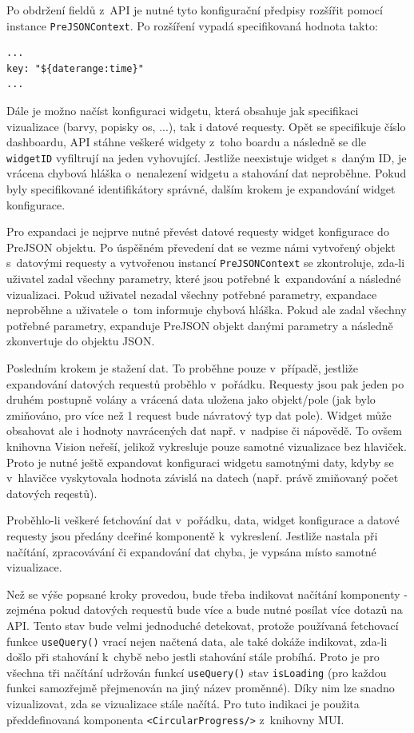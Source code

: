 \documentclass[czech, bc, kiv, he, iso690numb, viewonly]{fasthesis} %
\begin{document}
Po obdržení fieldů z~API je nutné tyto konfigurační předpisy rozšířit pomocí instance \texttt{PreJSONContext}. Po rozšíření vypadá specifikovaná hodnota takto:
\lstset{style=plainsrc}
\begin{lstlisting}
...
key: "${daterange:time}"
...
\end{lstlisting}

Dále je možno načíst konfiguraci widgetu, která obsahuje jak specifikaci vizualizace (barvy, popisky os, ...), tak i datové requesty. Opět se specifikuje číslo dashboardu, API stáhne veškeré widgety z~toho boardu a následně se dle \texttt{widgetID} vyfiltrují na jeden vyhovující. Jestliže
neexistuje widget s~daným ID, je vrácena chybová hláška o~nenalezení widgetu a stahování dat neproběhne. Pokud byly specifikované identifikátory správné, dalším krokem je expandování
widget konfigurace. 

Pro expandaci je nejprve nutné převést datové requesty widget konfigurace do PreJSON objektu. Po úspěšném převedení dat se vezme námi vytvořený objekt s~datovými requesty a vytvořenou instancí \texttt{PreJSONContext} se zkontroluje, zda-li uživatel zadal všechny parametry, které jsou
potřebné k~expandování a následné vizualizaci. Pokud uživatel nezadal všechny potřebné parametry, expandace neproběhne a uživatele o~tom informuje chybová hláška. Pokud ale zadal 
všechny potřebné parametry, expanduje PreJSON objekt danými parametry a následně zkonvertuje do objektu JSON.

Posledním krokem je stažení dat. To proběhne pouze v~případě, jestliže expandování datových requestů proběhlo v~pořádku. Requesty jsou pak jeden po druhém postupně volány a vrácená data
uložena jako objekt/pole (jak bylo zmiňováno, pro více než 1 request bude návratový typ dat pole). Widget může obsahovat ale i hodnoty navrácených dat např. v~nadpise či nápovědě.
To ovšem knihovna Vision neřeší, jelikož vykresluje pouze samotné vizualizace bez hlaviček. Proto je nutné ještě expandovat konfiguraci widgetu samotnými daty, kdyby se v~hlavičce vyskytovala
hodnota závislá na datech (např. právě zmiňovaný počet datových reqestů). 

Proběhlo-li veškeré fetchování dat v~pořádku, data, widget konfigurace a datové requesty jsou předány dceřiné komponentě k~vykreslení. Jestliže nastala při načítání, zpracovávání či expandování dat
chyba, je vypsána místo samotné vizualizace. 

Než se výše popsané kroky provedou, bude třeba indikovat načítání komponenty - zejména pokud datových requestů bude více a bude nutné posílat více dotazů na API. Tento stav bude velmi jednoduché 
detekovat, protože používaná fetchovací funkce \texttt{useQuery()} vrací nejen načtená data, ale také dokáže indikovat, zda-li došlo při stahování k~chybě nebo jestli stahování stále probíhá. Proto
je pro všechna tři načítání udržován funkcí \texttt{useQuery()} stav \texttt{isLoading} (pro každou funkci samozřejmě přejmenován na jiný název proměnné). Díky nim lze snadno vizualizovat, zda se vizualizace stále načítá.
Pro tuto indikaci je použita předdefinovaná komponenta \texttt{<CircularProgress/>} z~knihovny MUI.
\end{document}
